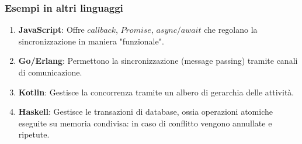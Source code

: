\documentclass{article}
\begin{document}
\subsubsection{Esempi in altri linguaggi}

\begin{enumerate}
    \item \textbf{JavaScript}: Offre $callback$, $Promise$, $async/await$ che regolano la sincronizzazione in maniera "funzionale".
    \item \textbf{Go/Erlang}: Permettono la sincronizzazione (message passing) tramite canali di comunicazione.
    \item \textbf{Kotlin}: Gestisce la concorrenza tramite un albero di gerarchia delle attività.
    \item \textbf{Haskell}: Gestisce le transazioni di database, ossia operazioni atomiche eseguite su memoria condivisa: in caso di conflitto vengono annullate e ripetute.
\end{enumerate}

\newpage
\end{document}
